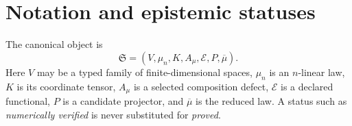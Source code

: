 \section{Notation and epistemic statuses}

The canonical object is
\[
\mathfrak S=(V,\mu_n,K,A_\mu,\mathcal E,P,\overline\mu).
\]
Here $V$ may be a typed family of finite-dimensional spaces, $\mu_n$ is an $n$-linear law, $K$ is its coordinate tensor, $A_\mu$ is a selected composition defect, $\mathcal E$ is a declared functional, $P$ is a candidate projector, and $\overline\mu$ is the reduced law. A status such as \emph{numerically verified} is never substituted for \emph{proved}.



